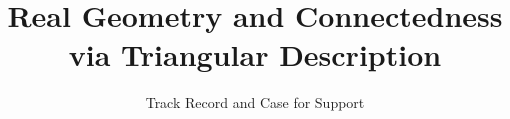 \documentclass[11pt,fullpage,twocolumn]{article}
\begin{document}
\title{Real Geometry and Connectedness via Triangular Description}
\date{Track Record and Case for Support}
\maketitle

%
\vfill\pagebreak

%
%

%
\end{document}
